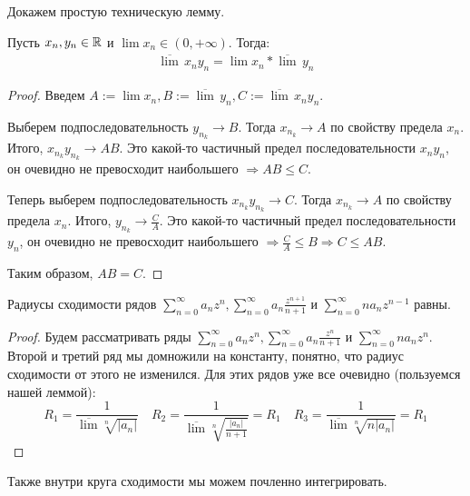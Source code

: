 \vspace*{10mm}

Докажем простую техническую лемму.

\begin{lemma}
    Пусть $x_n, y_n \in \mathbb{R}$ и $\lim x_n \in (0, +\infty)$. 
    Тогда:
    \begin{gather*}
        \overline{\lim} \, x_ny_n = \lim x_n * \overline{\lim} \, y_n
    \end{gather*}
\end{lemma}
\begin{proof}
    Введем $A := \lim x_n, B := \overline{\lim} \, y_n, C := \overline{\lim} \, x_ny_n$.

    \quad Выберем подпоследовательность $y_{n_k} \to B$. 
    Тогда $x_{n_k} \to A$ по свойству предела $x_n$.
    Итого, $x_{n_k}y_{n_k} \to AB$. 
    Это какой-то частичный предел последовательности $x_ny_n$, он очевидно не превосходит наибольшего $\Rightarrow AB \leqslant C$.

    \quad Теперь выберем подпоследовательность $x_{n_k}y_{n_k} \to C$. 
    Тогда $x_{n_k} \to A$ по свойству предела $x_n$.
    Итого, $y_{n_k} \to \frac{C}{A}$.
    Это какой-то частичный предел последовательности $y_n$, он очевидно не превосходит наибольшего $\Rightarrow \frac{C}{A} \leqslant B \Rightarrow C \leqslant AB$.

    \quad Таким образом, $AB = C$.
\end{proof}

\begin{follow}
    Радиусы сходимости рядов $\sum\limits_{n=0}^\infty a_n z^n, \sum\limits_{n=0}^\infty a_n \frac{z^{n+1}}{n+1}$ и $\sum\limits_{n=0}^\infty n a_n z^{n-1}$ равны.
\end{follow}
\begin{proof}
    Будем рассматривать ряды $\sum\limits_{n=0}^\infty a_n z^n, \sum\limits_{n=0}^\infty a_n \frac{z^n}{n+1}$ и $\sum\limits_{n=0}^\infty n a_n z^{n}$. 
    Второй и третий ряд мы домножили на константу, понятно, что радиус сходимости от этого не изменился.
    Для этих рядов уже все очевидно (пользуемся нашей леммой): \[ R_1 = \frac{1}{\overline{\lim} \sqrt[n]{|a_n|}} \quad R_2 = \frac{1}{\overline{\lim} \sqrt[n]{\frac{|a_n|}{n+1}}} = R_1 \quad R_3 = \frac{1}{\overline{\lim} \sqrt[n]{n|a_n|}} = R_1   \]
\end{proof}

\vspace*{5mm}

Также внутри круга сходимости мы можем почленно интегрировать.

